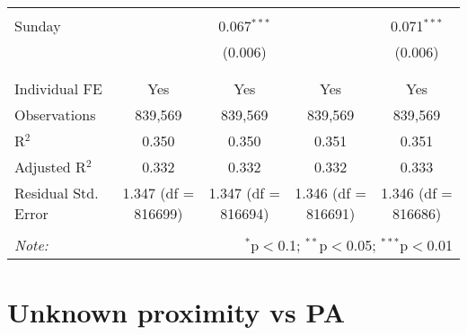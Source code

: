 \documentclass[
]{article}
\begin{document}
\begin{table}[!htbp]
{\begin{tabular}{@{\extracolsep{5pt}}lcccc}
  & & & & \\ 
 Sunday &  & 0.067$^{***}$ &  & 0.071$^{***}$ \\ 
  &  & (0.006) &  & (0.006) \\ 
  & & & & \\ 
\hline \\[-1.8ex] 
Individual FE & Yes & Yes & Yes & Yes \\ 
Observations & 839,569 & 839,569 & 839,569 & 839,569 \\ 
R$^{2}$ & 0.350 & 0.350 & 0.351 & 0.351 \\ 
Adjusted R$^{2}$ & 0.332 & 0.332 & 0.332 & 0.333 \\ 
Residual Std. Error & 1.347 (df = 816699) & 1.347 (df = 816694) & 1.346 (df = 816691) & 1.346 (df = 816686) \\ 
\hline 
\hline \\[-1.8ex] 
\textit{Note:}  & \multicolumn{4}{r}{$^{*}$p$<$0.1; $^{**}$p$<$0.05; $^{***}$p$<$0.01} \\ 
\end{tabular}
} 
\end{table} 
\newpage
\section{Unknown proximity vs PA}
\end{document}
